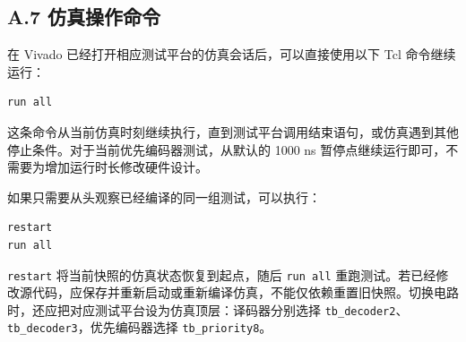 \documentclass[12pt,a4paper,fontset=fandol]{ctexart}
\begin{document}
\subsection*{A.7 仿真操作命令}

在 Vivado 已经打开相应测试平台的仿真会话后，可以直接使用以下 Tcl 命令继续运行：
\begin{lstlisting}[language={},numbers=none,caption={继续执行剩余仿真事件}]
run all
\end{lstlisting}

这条命令从当前仿真时刻继续执行，直到测试平台调用结束语句，或仿真遇到其他停止条件。对于当前优先编码器测试，从默认的 1000 ns 暂停点继续运行即可，不需要为增加运行时长修改硬件设计。

如果只需要从头观察已经编译的同一组测试，可以执行：
\begin{lstlisting}[language={},numbers=none,caption={重置时间并重新运行当前仿真}]
restart
run all
\end{lstlisting}

\texttt{restart} 将当前快照的仿真状态恢复到起点，随后 \texttt{run all} 重跑测试。若已经修改源代码，应保存并重新启动或重新编译仿真，不能仅依赖重置旧快照。切换电路时，还应把对应测试平台设为仿真顶层：译码器分别选择 \texttt{tb\_decoder2}、\texttt{tb\_decoder3}，优先编码器选择 \texttt{tb\_priority8}。
\end{document}

